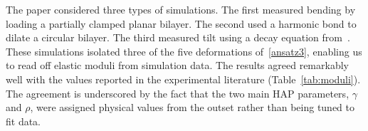 The paper \cite{Fu2018_SIAM} considered three types of simulations. The first measured bending by
loading a partially clamped planar bilayer. The second used a harmonic
bond to dilate a circular bilayer. The third measured tilt using a decay
equation from~\cite{KUZMIN2005}. These simulations isolated three of the
five deformations of~\eqref{ansatz3}, enabling us to read off elastic
moduli from simulation data. The results agreed remarkably well with the
values reported in the experimental literature (Table~\ref{tab:moduli}).
The agreement is underscored by the fact that the two main HAP
parameters, $\gamma$ and $\rho$, were assigned physical values from the
outset rather than being tuned to fit data. 

